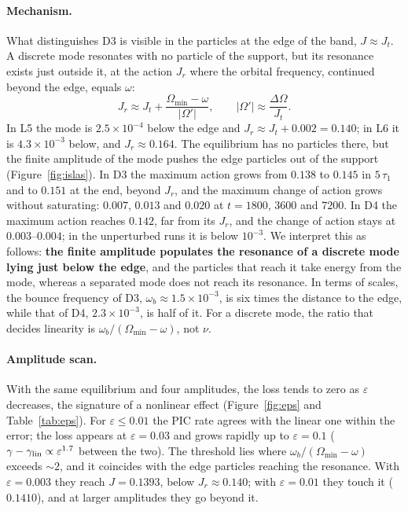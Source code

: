 \documentclass[11pt,a4paper]{article}
\begin{document}
\paragraph{Mechanism.} What distinguishes D3 is visible in the particles at the edge of
the band, $J\approx J_t$. A discrete mode resonates with no particle of the support, but
its resonance exists just outside it, at the action $J_r$ where the orbital frequency,
continued beyond the edge, equals $\omega$:
\[
  J_r\approx J_t+\frac{\Omega_{\min}-\omega}{|\Omega'|},\qquad |\Omega'|\approx\frac{\Delta\Omega}{J_t}.
\]
In L5 the mode is $2.5\times10^{-4}$ below the edge and $J_r\approx J_t+0.002=0.140$; in L6 it
is $4.3\times10^{-3}$ below, and $J_r\approx0.164$. The equilibrium has no particles there,
but the finite amplitude of the mode pushes the edge particles out of the support
(Figure~\ref{fig:islas}). In D3 the maximum action grows from $0.138$ to $0.145$ in
$5\,\tau_1$ and to $0.151$ at the end, beyond $J_r$, and the maximum change of action grows
without saturating: $0.007$, $0.013$ and $0.020$ at $t=1800$, $3600$ and $7200$. In D4 the
maximum action reaches $0.142$, far from its $J_r$, and the change of action stays at
$0.003$--$0.004$; in the unperturbed runs it is below $10^{-3}$. We interpret this as
follows: \textbf{the finite amplitude populates the resonance of a discrete mode lying
just below the edge}, and the particles that reach it take energy from the mode, whereas
a separated mode does not reach its resonance. In terms of scales, the bounce frequency
of D3, $\omega_b\approx1.5\times10^{-3}$, is six times the distance to the edge, while that of
D4, $2.3\times10^{-3}$, is half of it. For a discrete mode, the ratio that decides linearity
is $\omega_b/(\Omega_{\min}-\omega)$, not $\nu$.

\paragraph{Amplitude scan.} With the same equilibrium and four amplitudes, the loss
tends to zero as $\varepsilon$ decreases, the signature of a nonlinear effect
(Figure~\ref{fig:eps} and Table~\ref{tab:eps}). For $\varepsilon\le0.01$ the PIC rate agrees
with the linear one within the error; the loss appears at $\varepsilon=0.03$ and grows
rapidly up to $\varepsilon=0.1$ ($\gamma-\gamma_{\rm lin}\propto\varepsilon^{1.7}$ between the two).
The threshold lies where $\omega_b/(\Omega_{\min}-\omega)$ exceeds $\sim2$, and it coincides
with the edge particles reaching the resonance. With $\varepsilon=0.003$ they reach
$J=0.1393$, below $J_r\approx0.140$; with $\varepsilon=0.01$ they touch it ($0.1410$), and at
larger amplitudes they go beyond it.
\end{document}
